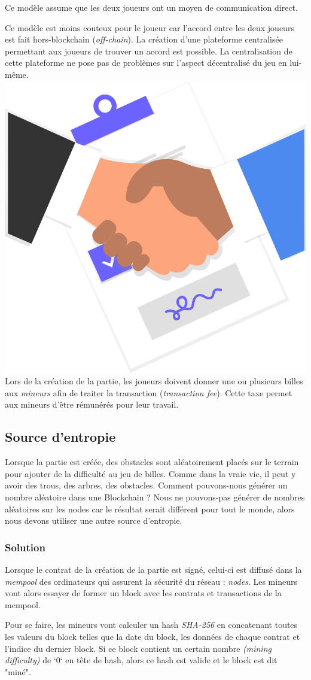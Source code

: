 \documentclass{article}
\begin{document}
Ce modèle assume que les deux joueurs ont un moyen de communication direct.

Ce modèle est moins couteux pour le joueur car l'accord entre les deux joueurs est fait hors-blockchain (\textit{off-chain}).
La création d'une plateforme centralisée permettant aux joueurs de trouver un accord est possible. La centralisation de cette plateforme ne pose pas de problèmes sur l'aspect décentralisé du jeu en lui-même.\\


\includegraphics[width=0.3\linewidth]{assets/agreement.png}\\

Lors de la création de la partie, les joueurs doivent donner une ou plusieurs billes aux \textit{mineurs} afin de traiter la transaction (\textit{transaction fee}). Cette taxe permet aux mineurs d'être rémunérés pour leur travail.


\subsection{Source d'entropie}
Lorsque la partie est créée, des obstacles sont aléatoirement placés sur le terrain pour ajouter de la difficulté au jeu de billes. Comme dans la vraie vie, il peut y avoir des trous, des arbres, des obstacles. Comment pouvons-nous générer un nombre aléatoire dans une Blockchain ?
Nous ne pouvons-pas générer de nombres aléatoires sur les nodes car le résultat serait différent pour tout le monde, alors nous devons utiliser une autre source d'entropie.

\subsubsection{Solution}

Lorsque le contrat de la création de la partie est signé, celui-ci est diffusé dans la \textit{mempool} des ordinateurs qui assurent la sécurité du réseau : \textit{nodes}. Les mineurs vont alors essayer de former un block avec les contrats et transactions de la mempool.

Pour se faire, les mineurs vont calculer un hash \textit{SHA-256} en concatenant toutes les valeurs du block telles que la date du block, les données de chaque contrat et l'indice du dernier block. Si ce block contient un certain nombre \textit{(mining difficulty)} de `0` en tête de hash, alors ce hash est valide et le block est dit "miné".
\end{document}
